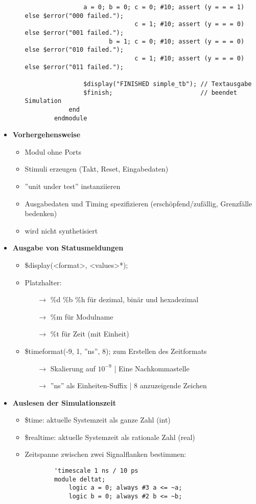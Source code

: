 \begin{itemize}
\begin{itemize}
\begin{lstlisting}
				a = 0; b = 0; c = 0; #10; assert (y = = = 1) else $error("000 failed.");
							  c = 1; #10; assert (y = = = 0) else $error("001 failed.");
					   b = 1; c = 0; #10; assert (y = = = 0) else $error("010 failed.");
					   	      c = 1; #10; assert (y = = = 0) else $error("011 failed.");
					   	      
				$display("FINISHED simple_tb"); // Textausgabe
				$finish; 						// beendet Simulation
			end
		endmodule
		\end{lstlisting}
	\end{itemize}
	
\item \textbf{Vorhergehensweise}
	\begin{itemize}
	\item Modul ohne Ports
	\item Stimuli erzeugen (Takt, Reset, Eingabedaten)
	\item ''unit under test'' instanziieren
	\item Ausgabedaten und Timing spezifizieren (erschöpfend/zufällig, Grenzfälle bedenken)
	\item wird nicht synthetisiert
	\end{itemize}

\item \textbf{Ausgabe von Statusmeldungen}
	\begin{itemize}
	\item \$display(<format>, <values>*);
	\item Platzhalter:
		\begin{itemize}
		\item[$\rightarrow$] \%d \%b \%h für dezimal, binär und hexadezimal
		\item[$\rightarrow$] \%m für Modulname
		\item[$\rightarrow$] \%t für Zeit (mit Einheit)
		\end{itemize}
	\item \$timeformat(-9, 1, ''ns'', 8); zum Erstellen des Zeitformats
		\begin{itemize}
		\item[$\rightarrow$] Skalierung auf $10^{-9}$ | Eine Nachkommastelle
		\item[$\rightarrow$] ''ns'' als Einheiten-Suffix | 8 anzuzeigende Zeichen
		\end{itemize}
	\end{itemize}

\item \textbf{Auslesen der Simulationszeit}
	\begin{itemize}
	\item \$time: aktuelle Systemzeit als ganze Zahl (int)
	\item \$realtime: aktuelle Systemzeit als rationale Zahl (real)
	\item Zeitspanne zwischen zwei Signalflanken bestimmen:
	\item[]
		\begin{lstlisting}
		'timescale 1 ns / 10 ps
		module deltat;
			logic a = 0; always #3 a <= ~a;
			logic b = 0; always #2 b <= ~b;
			

\end{lstlisting}
\end{itemize}
\end{itemize}
